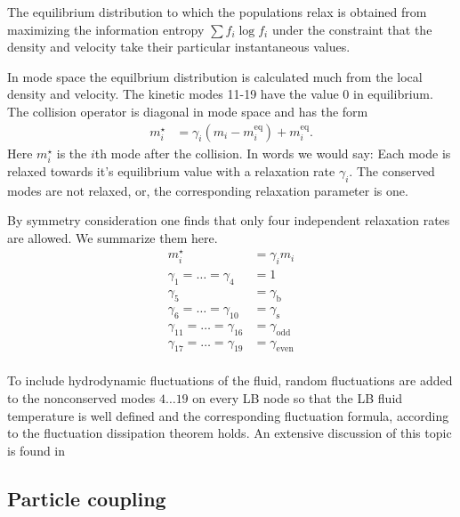 The equilibrium distribution to which the populations relax 
is obtained from maximizing the information entropy 
$\sum f_i \log f_i$ under the constraint that the density
and velocity take their particular instantaneous 
values. 

In mode space the equilbrium distribution is calculated much from 
the local density and velocity.
The kinetic modes 11-19 have the value 0 in equilibrium.
The collision operator is diagonal in mode space
and has the form
\begin{align*}
  m^\star_i &= \gamma_i \left( m_i - m_i^\text{eq} \right) + m_i ^\text{eq}.
\end{align*}
Here $m^\star_i$ is the $i$th mode after the collision.
In words we would say: Each mode is relaxed towards
it's equilibrium value with a relaxation rate $\gamma_i$.
The conserved modes are not relaxed, or, the corresponding
relaxation parameter is one.

By symmetry consideration one finds that only four independent
relaxation rates are allowed. We summarize them here.
\begin{align*}
  m^\star_i &= \gamma_i m_i  \\
  \gamma_1=\dots=\gamma_4&=1 \\
  \gamma_5&=\gamma_\text{b} \\
  \gamma_6=\dots=\gamma_{10}&=\gamma_\text{s} \\
  \gamma_{11}=\dots=\gamma_{16}&=\gamma_\text{odd} \\
  \gamma_{17}=\dots = \gamma_{19}&=\gamma_\text{even} \\
\end{align*}

To include hydrodynamic fluctuations of the fluid, 
random fluctuations are added to the nonconserved modes $4\dots 19$ on every LB node so that
the LB fluid temperature is well defined and the corresponding
fluctuation formula, according to the fluctuation dissipation theorem holds.
An extensive discussion of this topic is found in \cite{duenweg07a}

\subsection*{Particle coupling}

